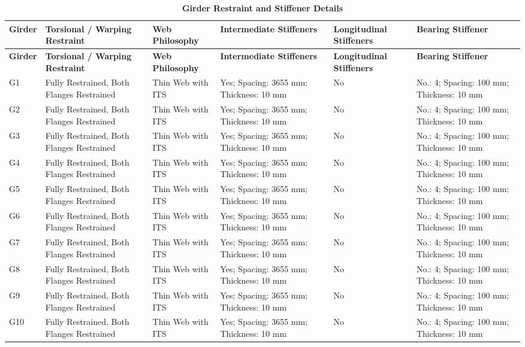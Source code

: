 \documentclass[12pt,a4paper]{report}
\numberwithin{table}{chapter}
\numberwithin{figure}{chapter}
\newcommand{\ReportTableRowGap}{6pt}
\begin{document}
\vspace{4pt}
\begin{longtable}{|L{1.4cm}|p{2.2cm}|p{2.2cm}|p{3.0cm}|p{2.4cm}|p{2.2cm}|}
\caption{\textbf{Girder Restraint and Stiffener Details}}\\
\hline
\textbf{Girder} & \textbf{Torsional / Warping Restraint} & \textbf{Web Philosophy} & \textbf{Intermediate Stiffeners} & \textbf{Longitudinal Stiffeners} & \textbf{Bearing Stiffener} \\[\ReportTableRowGap]
\hline
\endfirsthead
\hline
\textbf{Girder} & \textbf{Torsional / Warping Restraint} & \textbf{Web Philosophy} & \textbf{Intermediate Stiffeners} & \textbf{Longitudinal Stiffeners} & \textbf{Bearing Stiffener} \\[\ReportTableRowGap]
\hline
\endhead

\endfirsthead
\endhead

G1 & Fully Restrained, Both Flanges Restrained & Thin Web with ITS & Yes; Spacing: 3655 mm; Thickness: 10 mm & No & No.: 4; Spacing: 100 mm; Thickness: 10 mm \\[8pt]
\hline
G2 & Fully Restrained, Both Flanges Restrained & Thin Web with ITS & Yes; Spacing: 3655 mm; Thickness: 10 mm & No & No.: 4; Spacing: 100 mm; Thickness: 10 mm \\[8pt]
\hline
G3 & Fully Restrained, Both Flanges Restrained & Thin Web with ITS & Yes; Spacing: 3655 mm; Thickness: 10 mm & No & No.: 4; Spacing: 100 mm; Thickness: 10 mm \\[8pt]
\hline
G4 & Fully Restrained, Both Flanges Restrained & Thin Web with ITS & Yes; Spacing: 3655 mm; Thickness: 10 mm & No & No.: 4; Spacing: 100 mm; Thickness: 10 mm \\[8pt]
\hline
G5 & Fully Restrained, Both Flanges Restrained & Thin Web with ITS & Yes; Spacing: 3655 mm; Thickness: 10 mm & No & No.: 4; Spacing: 100 mm; Thickness: 10 mm \\[8pt]
\hline
G6 & Fully Restrained, Both Flanges Restrained & Thin Web with ITS & Yes; Spacing: 3655 mm; Thickness: 10 mm & No & No.: 4; Spacing: 100 mm; Thickness: 10 mm \\[8pt]
\hline
G7 & Fully Restrained, Both Flanges Restrained & Thin Web with ITS & Yes; Spacing: 3655 mm; Thickness: 10 mm & No & No.: 4; Spacing: 100 mm; Thickness: 10 mm \\[8pt]
\hline
G8 & Fully Restrained, Both Flanges Restrained & Thin Web with ITS & Yes; Spacing: 3655 mm; Thickness: 10 mm & No & No.: 4; Spacing: 100 mm; Thickness: 10 mm \\[8pt]
\hline
G9 & Fully Restrained, Both Flanges Restrained & Thin Web with ITS & Yes; Spacing: 3655 mm; Thickness: 10 mm & No & No.: 4; Spacing: 100 mm; Thickness: 10 mm \\[8pt]
\hline
G10 & Fully Restrained, Both Flanges Restrained & Thin Web with ITS & Yes; Spacing: 3655 mm; Thickness: 10 mm & No & No.: 4; Spacing: 100 mm; Thickness: 10 mm \\[8pt]
\hline
\end{longtable}
\end{document}
